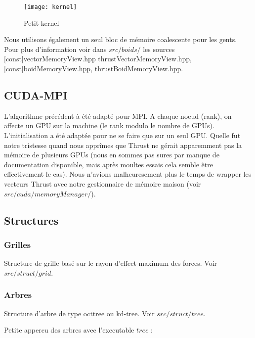 \begin{figure}[h]
    \begin{center}
            \texttt{[image: kernel]} \\
            \caption{Petit kernel}
    \end{center}
\end{figure}

\vskip 0.2cm
Nous utilisons également un seul bloc de mémoire coalescente pour les gents. Pour plus d'information voir dans $src/boids/$ les sources [const]vectorMemoryView.hpp thrustVectorMemoryView.hpp, [const]boidMemoryView.hpp, thrustBoidMemoryView.hpp.

\subsection{CUDA-MPI}

L'algorithme précédent à été adapté pour MPI. A chaque noeud (rank), on affecte un GPU sur la machine (le rank modulo le nombre de GPUs). 
L'initialisation a été adaptée pour ne se faire que sur un seul GPU. Quelle fut notre tristesse quand nous apprîmes que Thrust ne gérait apparemment pas la mémoire de plusieurs GPUs (nous en sommes pas sures par manque de documentation disponible, mais après moultes essais cela semble être effectivement le cas). Nous n'avions malheuresement plus le temps de wrapper les vecteurs Thrust avec notre gestionnaire de mémoire maison (voir $src/cuda/memoryManager/$).


\subsection{Structures}
\subsubsection{Grilles}
    
    Structure de grille basé sur le rayon d'effect maximum des forces. 
    Voir $src/struct/grid$.

\subsubsection{Arbres}
    
    Structure d'arbre de type octtree ou kd-tree. 
    Voir $src/struct/tree$.

    Petite appercu des arbres avec l'executable $tree$ :

